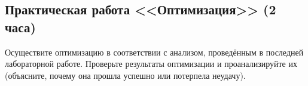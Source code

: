 \subsection{Практическая работа <<Оптимизация>> (2 часа)}

Осуществите оптимизацию в соответствии с анализом, проведённым в последней лабораторной работе. Проверьте результаты оптимизации и проанализируйте их 
(объясните, почему она прошла успешно или потерпела неудачу).
